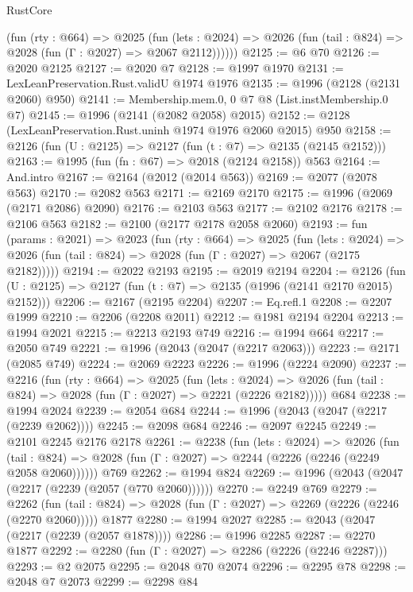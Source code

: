\begin{lexlean}{RustCore}
\begin{coremodule}
        (fun (rty : @664) =>
        @2025
          (fun (lets : @2024) =>
          @2026 (fun (tail : @824) => @2028 (fun (Γ : @2027) => @2067 @2112))))))
@2125 := @6 @70
@2126 := @2020 @2125
@2127 := @2020 @7
@2128 := @1997 @1970
@2131 := LexLeanPreservation.Rust.validU @1974 @1976
@2135 := @1996 (@2128 (@2131 @2060) @950)
@2141 := Membership.mem.{0, 0} @7 @8 (List.instMembership.{0} @7)
@2145 := @1996 (@2141 (@2082 @2058) @2015)
@2152 := @2128 (LexLeanPreservation.Rust.uninh @1974 @1976 @2060 @2015) @950
@2158 := @2126 (fun (U : @2125) => @2127 (fun (t : @7) => @2135 (@2145 @2152)))
@2163 := @1995 (fun (fn : @67) => @2018 (@2124 @2158)) @563
@2164 := And.intro
@2167 := @2164 (@2012 (@2014 @563))
@2169 := @2077 (@2078 @563)
@2170 := @2082 @563
@2171 := @2169 @2170
@2175 := @1996 (@2069 (@2171 @2086) @2090)
@2176 := @2103 @563
@2177 := @2102 @2176
@2178 := @2106 @563
@2182 := @2100 (@2177 @2178 @2058 @2060)
@2193 := fun (params : @2021) =>
  @2023
    (fun (rty : @664) =>
    @2025
      (fun (lets : @2024) =>
      @2026 (fun (tail : @824) => @2028 (fun (Γ : @2027) => @2067 (@2175 @2182)))))
@2194 := @2022 @2193
@2195 := @2019 @2194
@2204 := @2126 (fun (U : @2125) => @2127 (fun (t : @7) => @2135 (@1996 (@2141 @2170 @2015) @2152)))
@2206 := @2167 (@2195 @2204)
@2207 := Eq.refl.{1}
@2208 := @2207 @1999
@2210 := @2206 (@2208 @2011)
@2212 := @1981 @2194 @2204
@2213 := @1994 @2021
@2215 := @2213 @2193 @749
@2216 := @1994 @664
@2217 := @2050 @749
@2221 := @1996 (@2043 (@2047 (@2217 @2063)))
@2223 := @2171 (@2085 @749)
@2224 := @2069 @2223
@2226 := @1996 (@2224 @2090)
@2237 := @2216
    (fun (rty : @664) =>
    @2025
      (fun (lets : @2024) =>
      @2026 (fun (tail : @824) => @2028 (fun (Γ : @2027) => @2221 (@2226 @2182)))))
    @684
@2238 := @1994 @2024
@2239 := @2054 @684
@2244 := @1996 (@2043 (@2047 (@2217 (@2239 @2062))))
@2245 := @2098 @684
@2246 := @2097 @2245
@2249 := @2101 @2245 @2176 @2178
@2261 := @2238
    (fun (lets : @2024) =>
    @2026
      (fun (tail : @824) => @2028 (fun (Γ : @2027) => @2244 (@2226 (@2246 (@2249 @2058 @2060))))))
    @769
@2262 := @1994 @824
@2269 := @1996 (@2043 (@2047 (@2217 (@2239 (@2057 (@770 @2060))))))
@2270 := @2249 @769
@2279 := @2262
    (fun (tail : @824) => @2028 (fun (Γ : @2027) => @2269 (@2226 (@2246 (@2270 @2060)))))
    @1877
@2280 := @1994 @2027
@2285 := @2043 (@2047 (@2217 (@2239 (@2057 @1878))))
@2286 := @1996 @2285
@2287 := @2270 @1877
@2292 := @2280 (fun (Γ : @2027) => @2286 (@2226 (@2246 @2287)))
@2293 := @2 @2075
@2295 := @2048 @70 @2074
@2296 := @2295 @78
@2298 := @2048 @7 @2073
@2299 := @2298 @84

\end{coremodule}
\end{lexlean}

